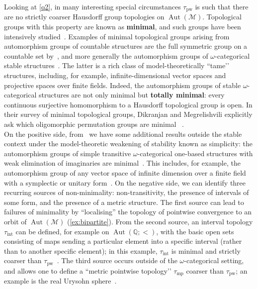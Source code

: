 \documentclass{article}
\theoremstyle{remark}
\theoremstyle{definition}
\DeclareMathOperator{\Aut}{Aut}
\newcommand{\M}[0]{\mathcal{M}}
\newcommand{\pw}[0]{\tau_{\mathrm{pw}}}
\newcommand{\mpw}[0]{\tau_{\mathrm{mp}}}
\begin{document}
Looking at \cref{q2}, in many interesting special circumstances $\pw$ is such that there are no strictly coarser Hausdorff group topologies on $\Aut(\M)$. Topological groups with this property are known as \textbf{minimal}, and such groups have been  intensively studied~\cite{dikranjan2013minimality}. 
Examples of minimal topological groups arising from automorphism groups of countable structures are  the full symmetric group on a countable set 
 by~\cite{gaughan1967topological}, and more generally the automorphism groups of $\omega$-categorical stable structures~\cite{ben2016weakly}. The latter is a rich class of model-theoretically ``tame’’ structures, including, for example, infinite-dimensional vector spaces and projective spaces over finite fields. Indeed, the automorphism groups of stable $\omega$-categorical structures are not only minimal but \textbf{totally minimal}:  every continuous surjective homomorphism  to a Hausdorff topological group is open.
In their survey of minimal topological groups, Dikranjan and Megrelishvili explicitly ask which oligomorphic permutation groups are minimal
~\cite[Question 2.3]{dikranjan2013minimality}.\\

On the positive side, from~\cite{ghaddln24} we have some additional results outside the stable context under the model-theoretic weakening of stability known as simplicity: the automorphism groups of simple transitive $\omega$-categorical one-based structures with weak elimination of imaginaries are minimal~\cite{ghaddln24}. This includes, for example, the automorphism group of any  vector space of infinite dimension over a finite field %
with a {symplectic or unitary 
form}~\cite{cherlin2003finite}. On the negative side, we can identify three 
recurring 
sources of non-minimality: non-transitivity, the presence of intervals of some form, and the presence of a metric structure. The first source can lead to failures of minimality by ``localising'' the topology of pointwise convergence to an orbit of $\Aut(\M)$ (\cref{ex:bipartite}). 
From the second source, an interval topology $\tau_{\mathrm{int}}$ can be defined, for example on $\Aut(\mathbb{Q}; <)$, with the basic open sets consisting of maps sending a particular element into a specific interval (rather than to another specific  element); in this example, $\tau_{\mathrm{int}}$  is minimal and strictly coarser than $\pw$~\cite{chang2017minimum, ghaddln24}. The third source occurs outside of the $\omega$-categorical setting, and allows one to define a ``metric pointwise topology’’ $\mpw$ coarser than $\pw$; an example is the real Urysohn sphere~\cite{uspenskij1990group}.
\end{document}
